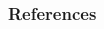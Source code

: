 \documentclass[10pt]{beamer}
\begin{document}
\section[References]{}
\begin{frame}
  \frametitle{References}
\nocite{*}
\begin{spacing}{1}
  
  
\end{spacing}
\end{frame}
\end{document}
